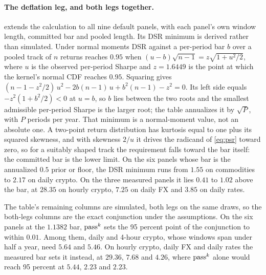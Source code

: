 \paragraph{The deflation leg, and both legs together.}  extends the calculation to all nine default panels, with each panel's own window length, committed bar and pooled length. Its DSR minimum is derived rather than simulated. Under normal moments DSR against a per-period bar $b$ over a pooled track of $n$ returns reaches $0.95$ when $(u-b)\sqrt{n-1} = z\sqrt{1+u^{2}/2}$, where $u$ is the observed per-period Sharpe and $z = 1.6449$ is the point at which the kernel's normal CDF reaches $0.95$. Squaring gives $(n-1-z^{2}/2)\,u^{2} - 2b(n-1)\,u + b^{2}(n-1) - z^{2} = 0$. Its left side equals $-z^{2}(1+b^{2}/2) < 0$ at $u = b$, so $b$ lies between the two roots and the smallest admissible per-period Sharpe is the larger root; the table annualizes it by $\sqrt{P}$, with $P$ periods per year. That minimum is a normal-moment value, not an absolute one. A two-point return distribution has kurtosis equal to one plus its squared skewness, and with skewness $2/u$ it drives the radicand of \cref{eq:psr} toward zero, so for a suitably shaped track the requirement falls toward the bar itself: the committed bar is the lower limit. On the six panels whose bar is the annualized $0.5$ prior or floor, the DSR minimum runs from $1.55$ on commodities to $2.17$ on daily crypto. On the three measured panels it lies $0.41$ to $1.02$ above the bar, at $28.35$ on hourly crypto, $7.25$ on daily FX and $3.85$ on daily rates.

The table's remaining columns are simulated, both legs on the same draws, so the both-legs columns are the exact conjunction under the assumptions. On the six panels at the $1.1382$ bar, $\text{pass}^{k}$ sets the 95 percent point of the conjunction to within $0.01$. Among them, daily and 4-hour crypto, whose windows span under half a year, need $5.64$ and $5.46$. On hourly crypto, daily FX and daily rates the measured bar sets it instead, at $29.36$, $7.68$ and $4.26$, where $\text{pass}^{k}$ alone would reach 95 percent at $5.44$, $2.23$ and $2.23$.

